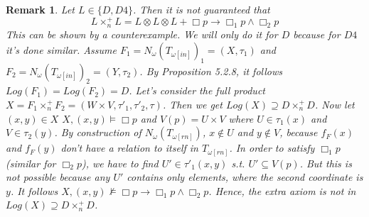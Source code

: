 \documentclass[12pt, a4paper]{scrartcl}
\newtheorem{remark}[definition]{Remark}
\begin{document}
    \begin{remark}
        Let $L \in \{D, D4\}$. Then it is not guaranteed that $$L \times^+_n L = L \otimes L \otimes L + \Box p \rightarrow \Box_1 p \land \Box_2 p$$
        This can be shown by a counterexample. We will only do it for $D$ because for $D4$ it's done similar. Assume $F_1 = N_\omega(T_{\omega[in]})_1 = (X, \tau_1)$ and $F_2 = N_\omega(T_{\omega[in]})_2 = (Y, \tau_2)$.
        By Proposition 5.2.8, it follows $Log(F_1) = Log(F_2) = D$. Let's consider the full product $X = F_1 \times^+_n F_2 = (W \times V, \tau'_1, \tau'_2, \tau)$. Then we get $Log(X) \supseteq D \times^+_n D$. Now let $(x,y) \in X$
        $X,(x,y) \vDash \Box p$ and $V(p) = U \times V$ where $U \in \tau_1(x)$ and $V \in \tau_2(y)$. By construction of $N_\omega(T_{\omega[rn]})$, $x \notin U$ and $ y \notin V$, because $f_F(x)$ and $f_F(y)$ don't have a relation to itself in $T_{\omega[rn]}$.
        In order to satisfy $\Box_1 p$ (similar for $\Box_2 p$), we have to find $U' \in \tau'_1(x,y)$ s.t. $U' \subseteq V(p)$. But this is not possible because any $U'$ contains only elements, where the second coordinate is $y$. It follows $X, (x,y) \nvDash \Box p \rightarrow \Box_1 p \land \Box_ 2 p$.
        Hence, the extra axiom is not in $Log(X) \supseteq D \times^+_n D$. 



    \end{remark}
\end{document}
